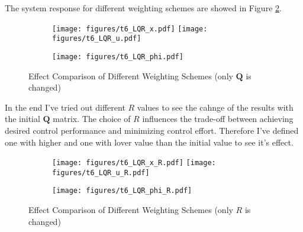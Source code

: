 \documentclass[12pt]{article}
\begin{document}
\noindent The system response for different weighting schemes are showed in Figure \ref{fig:t6_plots}.

\begin{figure}[htbp]
  \centering

  \begin{minipage}{\textwidth}
    \begin{subfigure}{\textwidth}
      \texttt{[image: figures/t6\_LQR\_x.pdf]}
      \hfill
      \texttt{[image: figures/t6\_LQR\_u.pdf]}
    \end{subfigure}

    \medskip
    

    \begin{subfigure}{\textwidth}
      \begin{center}
      \texttt{[image: figures/t6\_LQR\_phi.pdf]}
      \end{center}
    \end{subfigure}

    \caption{Effect Comparison of Different Weighting Schemes (only $\mathbf{Q}$ is changed)}
    \label{fig:t6_plots}
  \end{minipage}
 
\end{figure}
\newpage

\noindent In the end I've tried out different $R$ values to see the cahnge of the results with the initial $\mathbf{Q}$ matrix. The choice of $R$ influences the trade-off between achieving desired control performance and minimizing control effort. Therefore I've defined one with higher and one with lover value than the initial value to see it's effect.

\begin{figure}[htbp]
  \centering

  \begin{minipage}{\textwidth}
    \begin{subfigure}{\textwidth}
      \texttt{[image: figures/t6\_LQR\_x\_R.pdf]}
      \hfill
      \texttt{[image: figures/t6\_LQR\_u\_R.pdf]}
    \end{subfigure}

    \medskip
    

    \begin{subfigure}{\textwidth}
      \begin{center}
      \texttt{[image: figures/t6\_LQR\_phi\_R.pdf]}
      \end{center}
    \end{subfigure}

    \caption{Effect Comparison of Different Weighting Schemes (only $R$ is changed)}
    \label{fig:t6_plots}
  \end{minipage}
 
\end{figure}
\end{document}
